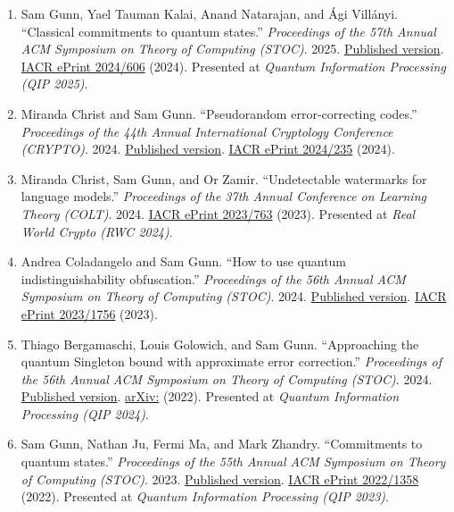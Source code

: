 \documentclass[line,margin]{res}
\begin{document}
\begin{resume}
\begin{enumerate}
\item Sam Gunn, Yael Tauman Kalai, Anand Natarajan, and {\'A}gi Vill{\'a}nyi. ``Classical commitments to quantum states.'' \emph{Proceedings of the 57th Annual ACM Symposium on Theory of Computing (STOC)}. 2025. \href{https://doi.org/10.1145/3717823.3718264}{Published version}. \href{https://eprint.iacr.org/2024/606}{IACR ePrint 2024/606} (2024). Presented at \emph{Quantum Information Processing (QIP 2025)}.

\item Miranda Christ and Sam Gunn. ``Pseudorandom error-correcting codes.'' \emph{Proceedings of the 44th Annual International Cryptology Conference (CRYPTO)}. 2024. \href{https://doi.org/10.1007/978-3-031-68391-6_10}{Published version}. \href{https://eprint.iacr.org/2024/235}{IACR ePrint 2024/235} (2024).

\item Miranda Christ, Sam Gunn, and Or Zamir. ``Undetectable watermarks for language models.'' \emph{Proceedings of the 37th Annual Conference on Learning Theory (COLT)}. 2024. \href{https://eprint.iacr.org/2023/763}{IACR ePrint 2023/763} (2023). Presented at \emph{Real World Crypto (RWC 2024)}.

\item Andrea Coladangelo and Sam Gunn. ``How to use quantum indistinguishability obfuscation.'' \emph{Proceedings of the 56th Annual ACM Symposium on Theory of Computing (STOC)}. 2024. \href{https://doi.org/10.1145/3618260.3649779}{Published version}. \href{https://eprint.iacr.org/2023/1756}{IACR ePrint 2023/1756} (2023).

\item Thiago Bergamaschi, Louis Golowich, and Sam Gunn. ``Approaching the quantum Singleton bound with approximate error correction.'' \emph{Proceedings of the 56th Annual ACM Symposium on Theory of Computing (STOC)}. 2024. \href{https://doi.org/10.1145/3618260.3649680}{Published version}. \href{https://arxiv.org/abs/2212.09935}{arXiv:} (2022). Presented at \emph{Quantum Information Processing (QIP 2024)}.

\item Sam Gunn, Nathan Ju, Fermi Ma, and Mark Zhandry. ``Commitments to quantum states.'' \emph{Proceedings of the 55th Annual ACM Symposium on Theory of Computing (STOC)}. 2023. \href{https://doi.org/10.1145/3564246.3585198}{Published version}. \href{https://eprint.iacr.org/2022/1358}{IACR ePrint 2022/1358} (2022). Presented at \emph{Quantum Information Processing (QIP 2023)}.


\end{enumerate}
\end{resume}
\end{document}
